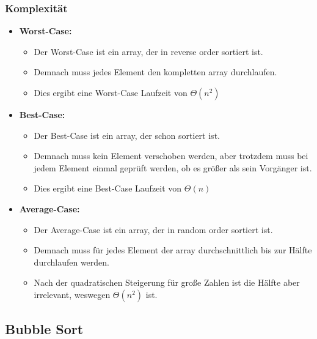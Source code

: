 \documentclass[
../AuD-Zusammenfassung.tex,
]
{subfiles}
\begin{document}
\subsubsection{Komplexität}
\begin{itemize}
    \item \textbf{Worst-Case:}
    \begin{itemize}
        \item Der Worst-Case ist ein array, der in reverse order sortiert ist. 
        \item Demnach muss jedes Element den kompletten array durchlaufen.
        \item Dies ergibt eine Worst-Case Laufzeit von $\Theta(n^2)$
    \end{itemize}
    \item \textbf{Best-Case:}
    \begin{itemize}
        \item Der Best-Case ist ein array, der schon sortiert ist.
        \item Demnach muss kein Element verschoben werden, aber trotzdem muss bei jedem Element einmal geprüft werden, ob es größer als sein Vorgänger ist.
        \item Dies ergibt eine Best-Case Laufzeit von $\Theta(n)$
    \end{itemize}
    \item \textbf{Average-Case:}
    \begin{itemize}
        \item Der Average-Case ist ein array, der in random order sortiert ist.
        \item Demnach muss für jedes Element der array durchschnittlich bis zur Hälfte durchlaufen werden.
        \item Nach der quadratischen Steigerung für große Zahlen ist die Hälfte aber irrelevant, weswegen $\Theta(n^2)$ ist.
    \end{itemize}
\end{itemize}


\subsection{Bubble Sort}
\begin{algorithm}[H]
\end{algorithm}
\end{document}
